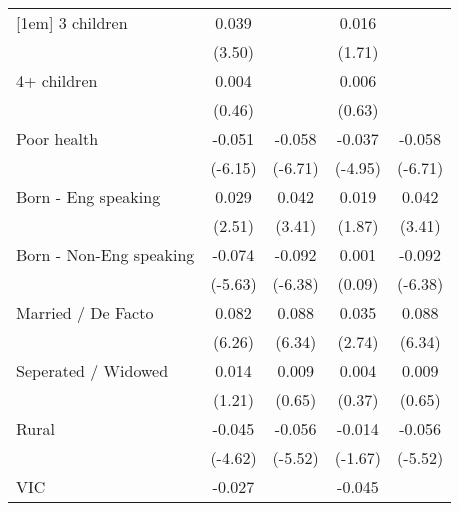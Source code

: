 {\begin{tabular}{l*{4}{c}}
[1em]
3 children          &       0.039\sym{***}&                     &       0.016         &                     \\
                    &      (3.50)         &                     &      (1.71)         &                     \\
[1em]
4+ children         &       0.004         &                     &       0.006         &                     \\
                    &      (0.46)         &                     &      (0.63)         &                     \\
[1em]
Poor health         &      -0.051\sym{***}&      -0.058\sym{***}&      -0.037\sym{***}&      -0.058\sym{***}\\
                    &     (-6.15)         &     (-6.71)         &     (-4.95)         &     (-6.71)         \\
[1em]
Born - Eng speaking &       0.029\sym{*}  &       0.042\sym{***}&       0.019         &       0.042\sym{***}\\
                    &      (2.51)         &      (3.41)         &      (1.87)         &      (3.41)         \\
[1em]
Born - Non-Eng speaking&      -0.074\sym{***}&      -0.092\sym{***}&       0.001         &      -0.092\sym{***}\\
                    &     (-5.63)         &     (-6.38)         &      (0.09)         &     (-6.38)         \\
[1em]
Married / De Facto  &       0.082\sym{***}&       0.088\sym{***}&       0.035\sym{**} &       0.088\sym{***}\\
                    &      (6.26)         &      (6.34)         &      (2.74)         &      (6.34)         \\
[1em]
Seperated / Widowed &       0.014         &       0.009         &       0.004         &       0.009         \\
                    &      (1.21)         &      (0.65)         &      (0.37)         &      (0.65)         \\
[1em]
Rural               &      -0.045\sym{***}&      -0.056\sym{***}&      -0.014         &      -0.056\sym{***}\\
                    &     (-4.62)         &     (-5.52)         &     (-1.67)         &     (-5.52)         \\
[1em]
VIC                 &      -0.027\sym{*}  &                     &      -0.045\sym{***}&                     \\

\end{tabular}}
